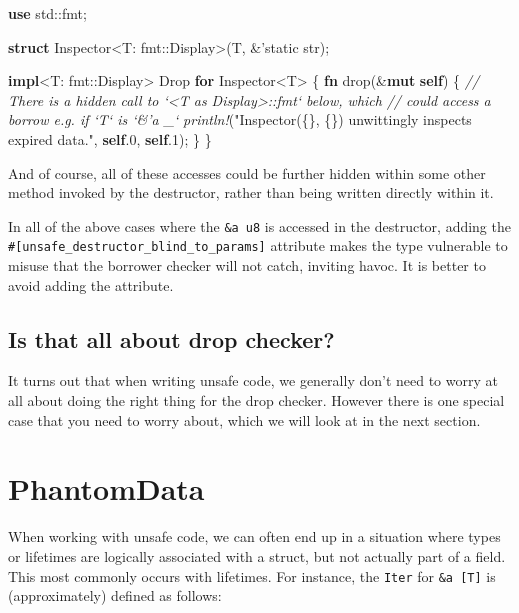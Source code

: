 \documentclass[a4paper,]{book}
\newenvironment{Shaded}{\begin{snugshade}}{\end{snugshade}}
\newcommand{\KeywordTok}[1]{\textcolor[rgb]{0.13,0.29,0.53}{\textbf{{#1}}}}
\newcommand{\DataTypeTok}[1]{\textcolor[rgb]{0.13,0.29,0.53}{{#1}}}
\newcommand{\DecValTok}[1]{\textcolor[rgb]{0.00,0.00,0.81}{{#1}}}
\newcommand{\StringTok}[1]{\textcolor[rgb]{0.31,0.60,0.02}{{#1}}}
\newcommand{\CommentTok}[1]{\textcolor[rgb]{0.56,0.35,0.01}{\textit{{#1}}}}
\newcommand{\OtherTok}[1]{\textcolor[rgb]{0.56,0.35,0.01}{{#1}}}
\newcommand{\BuiltInTok}[1]{{#1}}
\newcommand{\PreprocessorTok}[1]{\textcolor[rgb]{0.56,0.35,0.01}{\textit{{#1}}}}
\newcommand{\NormalTok}[1]{{#1}}
\begin{document}
\begin{Shaded}
\begin{Highlighting}[]
\KeywordTok{use} \NormalTok{std::fmt;}

\KeywordTok{struct} \NormalTok{Inspector<T: fmt::}\BuiltInTok{Display}\NormalTok{>(T, &}\OtherTok{'static} \DataTypeTok{str}\NormalTok{);}

\KeywordTok{impl}\NormalTok{<T: fmt::}\BuiltInTok{Display}\NormalTok{> }\BuiltInTok{Drop} \KeywordTok{for} \NormalTok{Inspector<T> \{}
    \KeywordTok{fn} \NormalTok{drop(&}\KeywordTok{mut} \KeywordTok{self}\NormalTok{) \{}
        \CommentTok{// There is a hidden call to `<T as Display>::fmt` below, which}
        \CommentTok{// could access a borrow e.g. if `T` is `&'a _`}
        \PreprocessorTok{println!}\NormalTok{(}\StringTok{"Inspector(\{\}, \{\}) unwittingly inspects expired data."}\NormalTok{,}
                 \KeywordTok{self}\NormalTok{.}\DecValTok{0}\NormalTok{, }\KeywordTok{self}\NormalTok{.}\DecValTok{1}\NormalTok{);}
    \NormalTok{\}}
\NormalTok{\}}
\end{Highlighting}
\end{Shaded}

And of course, all of these accesses could be further hidden within some
other method invoked by the destructor, rather than being written
directly within it.

In all of the above cases where the \texttt{\&\textquotesingle{}a\ u8}
is accessed in the destructor, adding the
\texttt{\#{[}unsafe\_destructor\_blind\_to\_params{]}} attribute makes
the type vulnerable to misuse that the borrower checker will not catch,
inviting havoc. It is better to avoid adding the attribute.

\subsection{Is that all about drop
checker?}\label{is-that-all-about-drop-checker}

It turns out that when writing unsafe code, we generally don't need to
worry at all about doing the right thing for the drop checker. However
there is one special case that you need to worry about, which we will
look at in the next section.

\section{PhantomData}\label{sec--phantom-data}

When working with unsafe code, we can often end up in a situation where
types or lifetimes are logically associated with a struct, but not
actually part of a field. This most commonly occurs with lifetimes. For
instance, the \texttt{Iter} for \texttt{\&\textquotesingle{}a\ {[}T{]}}
is (approximately) defined as follows:
\end{document}
